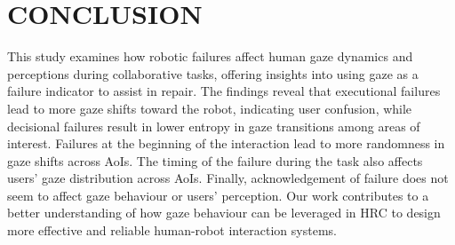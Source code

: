 
\section{CONCLUSION}

This study examines how robotic failures affect human gaze dynamics and perceptions during collaborative tasks, offering insights into using gaze as a failure indicator to assist in repair. The findings reveal that executional failures lead to more gaze shifts toward the robot, indicating user confusion, while decisional failures result in lower entropy in gaze transitions among areas of interest. 
Failures at the beginning of the interaction lead to more randomness in gaze shifts across AoIs. The timing of the failure during the task also affects users' gaze distribution across AoIs. Finally, acknowledgement of failure does not seem to affect gaze behaviour or users' perception. 
Our work contributes to a better understanding of how gaze behaviour can be leveraged in HRC to design more effective and reliable human-robot interaction systems.